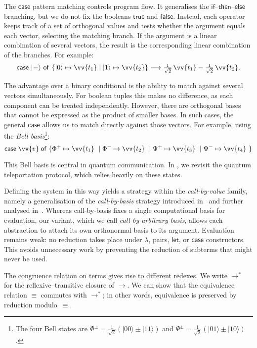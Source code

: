 \documentclass[runningheads,orivec,envcountsame,envcountsect]{llncs}
\newcommand\ket[1]{\ensuremath{|#1\rangle}}
\newcommand\lra{\longrightarrow}
\def\case#1#2#3#4#5{\ensuremath{\mathsf{case}~#1~\mathsf{of}~\{#2\mapsto #4 \mid #3\mapsto #5\}}}
\def\eval{\lra^*}
\def\sqrthalf{{\textstyle\frac{1}{\sqrt{2}}}}
\begin{document}
The $\mathsf{case}$ pattern matching controls program flow. It generalises the
$\mathsf{if}$--$\mathsf{then}$--$\mathsf{else}$ branching, but we do not fix
the booleans $\mathsf{true}$ and $\mathsf{false}$. Instead, each operator keeps
track of a set of orthogonal values and tests whether the argument equals each
vector, selecting the matching branch. If the argument is a linear combination
of several vectors, the result is the corresponding linear combination of the
branches. For example:
\[
  \case{\ket{-}}{\ket{0}}{\ket{1}}{\vv{t_1}}{\vv{t_2}} \lra
  \tfrac{1}{\sqrt{2}}\,\vv{t_1} - \tfrac{1}{\sqrt{2}}\,\vv{t_2}.
\]

The advantage over a binary conditional is the ability to match against several
vectors simultaneously. For boolean tuples this makes no difference, as each
component can be treated independently. However, there are orthogonal bases
that cannot be expressed as the product of smaller bases. In such cases, the
general $\mathsf{case}$ allows us to match directly against those vectors. For
example, using the \emph{Bell basis}\footnote{
The four Bell states are
$\Phi^{\pm}=\sqrthalf(\ket{00}\pm\ket{11})$ and
$\Psi^{\pm}=\sqrthalf(\ket{01}\pm\ket{10})$.
}:
\[
  \mathsf{case}\;\vv{v}\;\mathsf{of}\;\{
  \Phi^+ \mapsto \vv{t_1}\ \mid
  \Phi^- \mapsto \vv{t_2}\ \mid
  \Psi^+ \mapsto \vv{t_3}\ \mid
  \Psi^- \mapsto \vv{t_4}\ \}
\]

This Bell basis is central in quantum communication. In
, we revisit the quantum teleportation protocol,
which relies heavily on these states.

Defining the system in this way yields a strategy within the
\emph{call-by-value} family, namely a generalisation of the
\emph{call-by-basis} strategy introduced in~\cite{ArrighiDowekLMCS17} and
further analysed in~\cite{AssafDiazcaroPerdrixTassonValironLMCS14}. Whereas
call-by-basis fixes a single computational basis for evaluation, our variant,
which we call \emph{call-by-arbitrary-basis}, allows each abstraction to attach
its own orthonormal basis to its argument. Evaluation remains weak: no
reduction takes place under $\lambda$, pairs, $\mathsf{let}$, or
$\mathsf{case}$ constructors. This avoids unnecessary work by preventing the
reduction of subterms that might never be used.

The congruence relation on terms gives rise to different redexes. We write
$\eval$ for the reflexive–transitive closure of $\lra$. We can show that the
equivalence relation $\equiv$ commutes with $\eval$; in other words,
equivalence is preserved by reduction modulo~$\equiv$.
\end{document}
